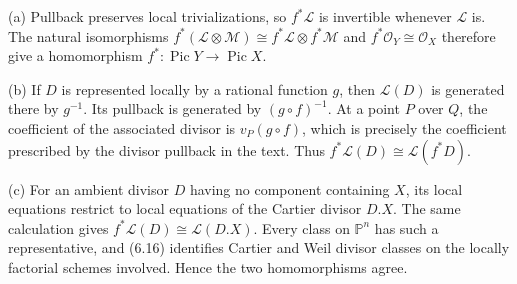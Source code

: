 (a) Pullback preserves local trivializations, so $f^*\mathcal L$ is invertible whenever $\mathcal L$ is. The natural isomorphisms $f^*(\mathcal L\otimes\mathcal M)\cong f^*\mathcal L\otimes f^*\mathcal M$ and $f^*\mathcal O_Y\cong\mathcal O_X$ therefore give a homomorphism $f^*:\operatorname{Pic}Y\to\operatorname{Pic}X$.

(b) If $D$ is represented locally by a rational function $g$, then $\mathcal L(D)$ is generated there by $g^{-1}$. Its pullback is generated by $(g\circ f)^{-1}$. At a point $P$ over $Q$, the coefficient of the associated divisor is $v_P(g\circ f)$, which is precisely the coefficient prescribed by the divisor pullback in the text. Thus $f^*\mathcal L(D)\cong\mathcal L(f^*D)$.

(c) For an ambient divisor $D$ having no component containing $X$, its local equations restrict to local equations of the Cartier divisor $D.X$. The same calculation gives $f^*\mathcal L(D)\cong\mathcal L(D.X)$. Every class on $\mathbb P^n$ has such a representative, and (6.16) identifies Cartier and Weil divisor classes on the locally factorial schemes involved. Hence the two homomorphisms agree.
